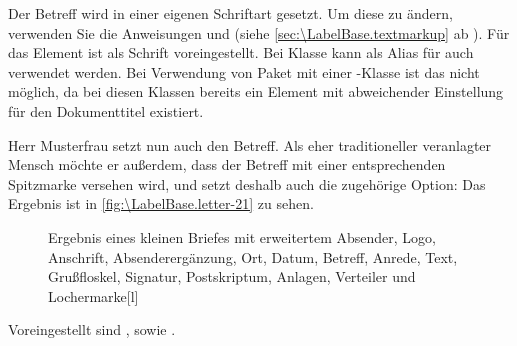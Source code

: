 \BeginIndexGroup
{}%
%
Der Betreff wird in einer eigenen Schriftart gesetzt. Um
diese zu ändern, verwenden Sie die Anweisungen
 und
 (siehe
\autoref{sec:\LabelBase.textmarkup} ab
). Für das
Element
 ist als
Schrift  voreingestellt. Bei Klasse
 kann als Alias für
 auch
 verwendet werden. Bei
Verwendung von Paket  mit einer \KOMAScript-Klasse ist das
nicht möglich, da bei diesen Klassen bereits ein Element
 mit abweichender Einstellung für den Dokumenttitel
existiert.
\EndIndexGroup

\begin{Example}
  Herr Musterfrau setzt nun auch den Betreff. %
  \iftrue %
  Als eher traditioneller veranlagter Mensch möchte er %
  \else %
  Er möchte %
  \fi %
  außerdem, dass der Betreff mit einer %
  \iftrue %
  entsprechenden %
  \fi %
  Spitzmarke versehen wird, und setzt deshalb auch die zugehörige Option:%
  Das Ergebnis ist in \autoref{fig:\LabelBase.letter-21} zu sehen.
  \begin{figure}
    \setcapindent{0pt}%
    \begin{captionbeside}{Ergebnis eines kleinen Briefes mit erweitertem Absender,
        Logo, Anschrift, Absenderergänzung, Ort, Datum, Betreff,
        Anrede, Text, Grußfloskel, Signatur, Postskriptum, Anlagen, Verteiler
        und Lochermarke}[l]
    \end{captionbeside}
    \label{fig:\LabelBase.letter-21}
  \end{figure}
\end{Example}
Voreingestellt sind
,  sowie
.%
\EndIndexGroup

